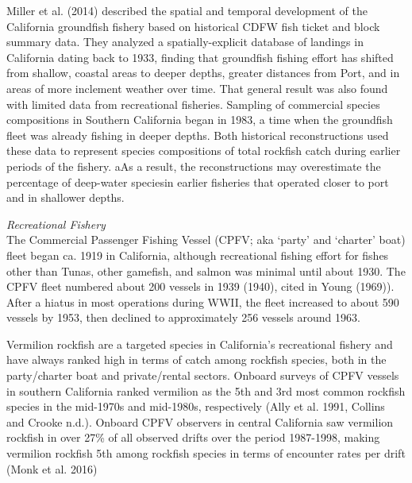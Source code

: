 \documentclass[11pt,
  english,
  a4paper,
]{article}
\begin{document}
Miller et al. {(2014)\leavevmode\tagmcend\tagstructend} described the spatial and temporal development of the California groundfish fishery based on historical CDFW fish ticket and block summary data. They analyzed a spatially-explicit database of landings in California dating back to 1933, finding that groundfish fishing effort has shifted from shallow, coastal areas to deeper depths, greater distances from Port, and in areas of more inclement weather over time. That general result was also found with limited data from recreational fisheries. Sampling of commercial species compositions in Southern California began in 1983, a time when the groundfish fleet was already fishing in deeper depths. Both historical reconstructions used these data to represent species compositions of total rockfish catch during earlier periods of the fishery. aAs a result, the reconstructions may overestimate the percentage of deep-water speciesin earlier fisheries that operated closer to port and in shallower depths.

\emph{Recreational Fishery}\\
The Commercial Passenger Fishing Vessel (CPFV; aka `party' and `charter' boat) fleet began ca. 1919 in California, although recreational fishing effort for fishes other than Tunas, other gamefish, and salmon was minimal until about 1930. The CPFV fleet numbered about 200 vessels in 1939 {(1940)\leavevmode\tagmcend\tagstructend}, cited in Young {(1969)\leavevmode\tagmcend\tagstructend}). After a hiatus in most operations during WWII, the fleet increased to about 590 vessels by 1953, then declined to approximately 256 vessels around 1963.

Vermilion rockfish are a targeted species in California's recreational fishery and have always ranked high in terms of catch among rockfish species, both in the party/charter boat and private/rental sectors. Onboard surveys of CPFV vessels in southern California ranked vermilion as the 5th and 3rd most common rockfish species in the mid-1970s and mid-1980s, respectively {(Ally et al. 1991, Collins and Crooke n.d.)\leavevmode\tagmcend\tagstructend}. Onboard CPFV observers in central California saw vermilion rockfish in over 27\% of all observed drifts over the period 1987-1998, making vermilion rockfish 5th among rockfish species in terms of encounter rates per drift {(Monk et al. 2016)\leavevmode\tagmcend\tagstructend}
\end{document}
